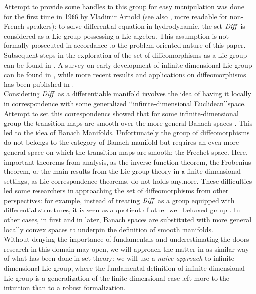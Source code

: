 Attempt to provide some handles to this group for easy manipulation was done for the first time in 1966 by Vladimir Arnold \cite{arnold1966geometrie} (see also \cite{arnold1998topological}, more readable for non-French speakers): to solve differential equation in hydrodynamic, the set $\text{\emph{Diff}}$ is considered as a Lie group possessing a Lie algebra. This assumption is not formally prosecuted in accordance to the problem-oriented nature of this paper. Subsequent steps in the exploration of the set of diffeomorphisms as a Lie group can be found in \cite{marsden1970hamiltonian, ebin1970groups, omori1970group, leslie1983lie}. A survey on early development of infinite dimensional Lie group can be found in \cite{Milnor:84:remarks}, while more recent results and applications on diffeomorphisms has been published in \cite{ovsienko1992integrals, bauer2010sobolev,schmid2010infinite,  bauer2011geodesic}.\\

Considering $\text{\emph{Diff}}$ as a differentiable manifold involves the idea of having it locally in correspondence with some generalized \lq\lq infinite-dimensional Euclidean\rq\rq\phantom{z}space. Attempt to set this correspondence showed that for some infinite-dimensional group the transition maps are smooth over the more general Banach spaces \cite{khesin2008geometry}. This led to the idea of Banach Manifolds. Unfortunately the group of diffeomorphisms do not belongs to the category of Banach manifold but requires an even more general space on which the transition maps are smooth: the Frechet space. Here, important theorems from analysis, as the inverse function theorem, the Frobenius theorem, or the main results from the Lie group theory in a finite dimensional settings, as Lie correspondence theorems, do not holds anymore. These difficulties led some researchers in approaching the set of diffeomorphisms from other perspectives: 
for example, instead of treating $\text{\emph{Diff}}$ as a group equipped with differential structures, it is seen as a quotient of other well behaved group \cite{wojtynski1994one}. In other cases, in \cite{marsden1970hamiltonian} first and in \cite{milnor1984remarks} later, Banach spaces are substituted with more general locally convex spaces to underpin the definition of smooth manifolds. \\

Without denying the importance of fundamentals and underestimating the doors research in this domain may open, we will approach the matter in as similar way of what has been done in set theory: we will use a \emph{naive approach} to infinite dimensional Lie group, where the fundamental definition of infinite dimensional Lie group is a generalization of the finite dimensional case left more to the intuition than to a robust formalization. \\

